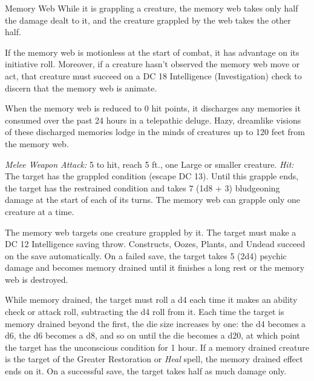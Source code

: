 \documentclass[10pt,a4paper,twoside,bg=print,twocolumn,openany,nodeprecatedcode]{dndbook}
\begin{document}
\begin{DndMonster}[float=t]{Memory Web}
\DndMonsterBasics[
armor-class = {14},
hit-points = {\DndDice{6d10 + 6}},
speed = {40 ft., climb 40 ft.}
]
\DndMonsterAbilityScores[
 str = 16,
 dex = 18,
 con = 13,
 int = 14,
 wis = 14,
 cha = 3
]
\DndMonsterDetails[
damage-resistances = {fire},
condition-immunities = {blinded, deafened},
senses = {blindsight 60 ft. (can't see beyond this radius), passive perception 12},
challenge = 4,
]
While it is grappling a creature, the memory web takes only half the damage dealt to it, and the creature grappled by the web takes the other half.

If the memory web is motionless at the start of combat, it has advantage on its initiative roll. Moreover, if a creature hasn't observed the memory web move or act, that creature must succeed on a DC 18 Intelligence (Investigation) check to discern that the memory web is animate.

When the memory web is reduced to 0 hit points, it discharges any memories it consumed over the past 24 hours in a telepathic deluge. Hazy, dreamlike visions of these discharged memories lodge in the minds of creatures up to 120 feet from the memory web.

\textsl{Melee Weapon Attack:} 5 to hit, reach 5 ft., one Large or smaller creature. \textsl{Hit:} The target has the grappled condition (escape DC 13). Until this grapple ends, the target has the restrained condition and takes 7 (1d8 + 3) bludgeoning damage at the start of each of its turns. The memory web can grapple only one creature at a time.

The memory web targets one creature grappled by it. The target must make a DC 12 Intelligence saving throw. Constructs, Oozes, Plants, and Undead succeed on the save automatically. On a failed save, the target takes 5 (2d4) psychic damage and becomes memory drained until it finishes a long rest or the memory web is destroyed.

While memory drained, the target must roll a d4 each time it makes an ability check or attack roll, subtracting the d4 roll from it. Each time the target is memory drained beyond the first, the die size increases by one: the d4 becomes a d6, the d6 becomes a d8, and so on until the die becomes a d20, at which point the target has the unconscious condition for 1 hour. If a memory drained creature is the target of the Greater Restoration or \textit{Heal} spell, the memory drained effect ends on it. On a successful save, the target takes half as much damage only.

\end{DndMonster}
\end{document}
